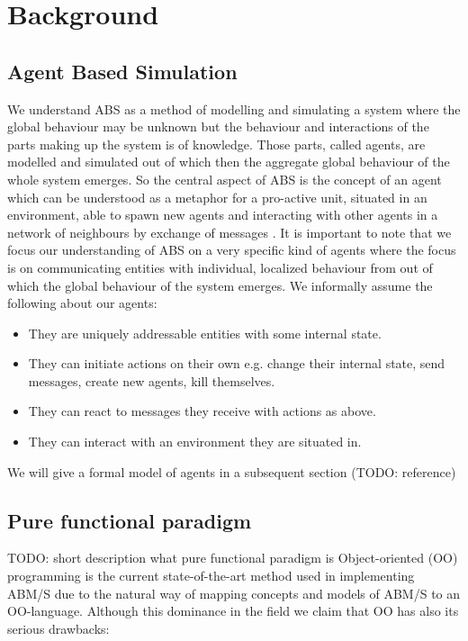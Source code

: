 \section{Background}

\subsection{Agent Based Simulation}
We understand ABS as a method of modelling and simulating a system where the global behaviour may be unknown but the behaviour and interactions of the parts making up the system is of knowledge. Those parts, called agents, are modelled and simulated out of which then the aggregate global behaviour of the whole system emerges. So the central aspect of ABS is the concept of an agent which can be understood as a metaphor for a pro-active unit, situated in an environment, able to spawn new agents and interacting with other agents in a network of neighbours by exchange of messages \cite{wooldridge_introduction_2009}. It is important to note that we focus our understanding of ABS on a very specific kind of agents where the focus is on communicating entities with individual, localized behaviour from out of which the global behaviour of the system emerges. We informally assume the following about our agents:

\begin{itemize}
	\item They are uniquely addressable entities with some internal state.
	\item They can initiate actions on their own e.g. change their internal state, send messages, create new agents, kill themselves.
	\item They can react to messages they receive with actions as above.
	\item They can interact with an environment they are situated in.
\end{itemize} 

We will give a formal model of agents in a subsequent section (TODO: reference)

\subsection{Pure functional paradigm}
TODO: short description what pure functional paradigm is
Object-oriented (OO) programming is the current state-of-the-art method used in implementing ABM/S due to the natural way of mapping concepts and models of ABM/S to an OO-language. Although this dominance in the field we claim that OO has also its serious drawbacks:

